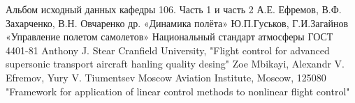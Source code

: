 \newpage
\pagestyle{fancy}
\fancyhf{}
\rfoot{\thepage}

\begin{thebibliography}{10}
    Альбом исходный данных кафедры 106. Часть 1 и часть 2   
    А.Е. Ефремов, В.Ф. Захарченко, В.Н. Овчаренко др. «Динамика полёта»
    Ю.П.Гуськов, Г.И.Загайнов «Управление полетом самолетов»
    Национальный стандарт атмосферы ГОСТ 4401-81
    Anthony J. Stear Cranfield University, "Flight control for advanced supersonic transport aircraft hanling quality desing" 
    Zoe Mbikayi, Alexandr V. Efremov, Yury V. Tiumentsev Moscow Aviation Institute, Moscow, 125080 "Framework for application of linear control methods to nonlinear  flight control"
\end{thebibliography}